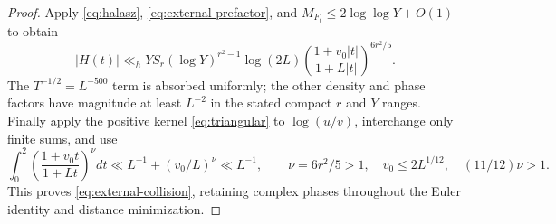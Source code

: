 \documentclass[11pt]{article}
\theoremstyle{definition}
\theoremstyle{remark}
\numberwithin{equation}{section}
\begin{document}
\begin{proof}
Apply \eqref{eq:halasz}, \eqref{eq:external-prefactor}, and
$M_{F_t}\le2\log\log Y+O(1)$ to obtain
\begin{equation}\label{eq:external-char-bound}
 |H(t)|\ll_h YS_r(\log Y)^{r^2-1}\log(2L)
 \left(\frac{1+v_0|t|}{1+L|t|}\right)^{6r^2/5}.
\end{equation}
The $T^{-1/2}=L^{-500}$ term is absorbed uniformly; the other density and phase factors have magnitude at least
$L^{-2}$ in the stated compact $r$ and $Y$ ranges.
Finally apply the positive kernel \eqref{eq:triangular} to $\log(u/v)$, interchange only finite sums, and use
\begin{equation}\label{eq:external-integral}
 \int_0^2\left(\frac{1+v_0t}{1+Lt}\right)^\nu dt
 \ll L^{-1}+(v_0/L)^\nu\ll L^{-1},\qquad
 \nu=6r^2/5>1,\quad v_0\le2L^{1/12},\quad(11/12)\nu>1.
\end{equation}
This proves \eqref{eq:external-collision}, retaining complex phases throughout the Euler identity and distance
minimization.
\end{proof}
\end{document}
